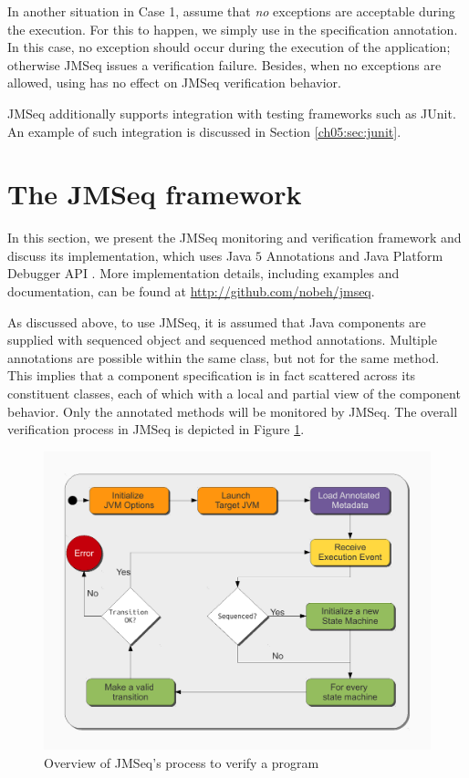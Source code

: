 In another situation in Case 1, assume that \emph{no} exceptions are
acceptable during the execution. For this to happen, we simply use
 in the specification annotation. In
this case, no exception should occur during the execution of the
application; otherwise JMSeq issues a verification failure. Besides,
when no exceptions are allowed, using  has no effect
on JMSeq verification behavior.

JMSeq additionally supports integration with testing frameworks such as JUnit. 
An example of such integration is discussed in Section \ref{ch05:sec:junit}.

\section{The JMSeq framework} \label{ch05:sec:implementation}

In this section, we present the JMSeq monitoring and verification framework and discuss its implementation, which uses Java $5$ Annotations \cite{Java_5_Annotations} and Java Platform Debugger API \cite{JPDA_Home}. 
More implementation details, including examples and documentation, can be found at \url{http://github.com/nobeh/jmseq}.

As discussed above, to use JMSeq, it is assumed that Java components are supplied with sequenced object and sequenced method annotations. 
Multiple annotations are possible within the same class, but not for the same method. 
This implies that a component specification is in fact scattered across its constituent classes, each of which with a local and partial view of the component behavior.
Only the annotated methods will be monitored by JMSeq.
The overall verification process in JMSeq is depicted in Figure \ref{ch05:fig:alg-verify}.

\begin{figure}[t]
\begin{center}
  \includegraphics[scale=0.47]{images/alg-diagram}
\end{center}
\caption{Overview of JMSeq's process to verify a program}
\label{ch05:fig:alg-verify}
\end{figure}

